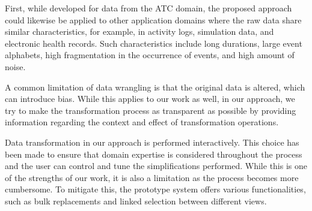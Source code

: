 \documentclass[camera]{vgtc}                          %
\begin{document}
First, while developed for data from the ATC domain, the proposed approach could likewise be applied to other application domains where the raw data share similar characteristics, for example, in activity logs, simulation data, and electronic health records. Such characteristics include long durations, large event alphabets, high fragmentation in the occurrence of events, and high amount of noise.

A common limitation of data wrangling is that the original data is altered, which can introduce bias. While this applies to our work as well, in our approach, we try to make the transformation process as transparent as possible by providing information regarding the context and effect of transformation operations. 

Data transformation in our approach is performed interactively. This choice has been made to ensure that domain expertise is considered throughout the process and the user can control and tune the simplifications performed. While this is one of the strengths of our work, it is also a limitation as the process becomes more cumbersome. To mitigate this, the prototype system offers various functionalities, such as bulk replacements and linked selection between different views. 
\end{document}
